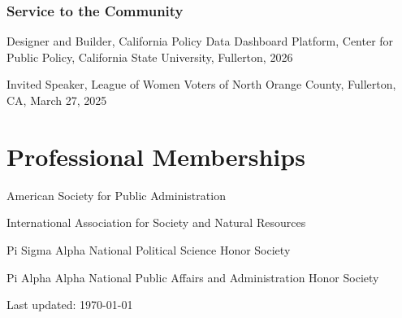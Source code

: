 \documentclass[11pt,letterpaper]{article}
\newcommand\tagpdfsetup[1]{}
\renewenvironment{itemize}{
  \begin{list}{}{
    \setlength{\leftmargin}{1.5em}
    \setlength{\itemsep}{0.25em}
    \setlength{\parskip}{0pt}
    \setlength{\parsep}{0.25em}
  }
}{
  \end{list}
}
\begin{document}
\subsubsection*{Service to the Community}
\begin{itemize}\leftmargin=2pt\itemindent=-15pt
    \item Designer and Builder, California Policy Data Dashboard Platform, Center for Public Policy, California State University, Fullerton, 2026
    \item Invited Speaker, League of Women Voters of North Orange County, Fullerton, CA, March 27, 2025
\end{itemize}

\section*{Professional Memberships}
\begin{itemize}\leftmargin=2pt\itemindent=-15pt
  \item American Society for Public Administration
  \item International Association for Society and Natural Resources
  \item Pi Sigma Alpha National Political Science Honor Society
  \item Pi Alpha Alpha National Public Affairs and Administration Honor Society
\end{itemize}

	
  \tagpdfsetup{activate-all=true, interwordspace=true}
\vspace{1em}
\begin{center}
  \begin{small}
    Last updated: \today
      \end{small}
\end{center}
\end{document}
